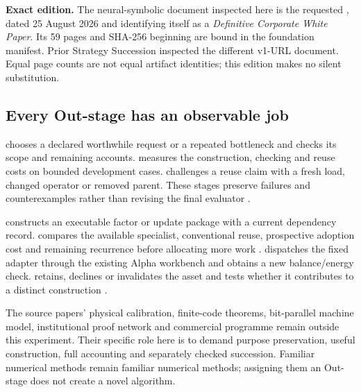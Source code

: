 \textbf{Exact edition.} The neural-symbolic document inspected here is the requested
, dated 25 August 2026 and identifying itself as a
\emph{Definitive Corporate White Paper}. Its 59 pages and SHA-256 beginning
 are bound in the foundation manifest. Prior Strategy Succession inspected the
different v1-URL document. Equal page counts are not equal artifact identities; this edition makes no silent substitution.

\subsection{Every Out-stage has an observable job}

 chooses a declared worthwhile request or a repeated bottleneck and checks its scope and
remaining accounts.  measures the construction, checking and reuse costs on bounded
development cases.  challenges a reuse claim with a fresh load, changed operator or removed
parent. These stages preserve failures and counterexamples rather than revising the final evaluator
\citep{foundation_outlearn,foundation_outthink}.

 constructs an executable factor or update package with a current dependency record.
 compares the available specialist, conventional reuse, prospective adoption cost and
remaining recurrence before allocating more work \citep{foundation_outdesign,foundation_outstrategise}.
 dispatches the fixed adapter through the existing Alpha workbench and obtains a new
balance/energy check.  retains, declines or invalidates the asset and tests whether it
contributes to a distinct construction \citep{foundation_outexecute,foundation_outevolve}.

The source papers' physical calibration, finite-code theorems, bit-parallel machine model, institutional proof
network and commercial programme remain outside this experiment. Their specific role here is to demand
purpose preservation, useful construction, full accounting and separately checked succession. Familiar
numerical methods remain familiar numerical methods; assigning them an Out-stage does not create a novel algorithm.

